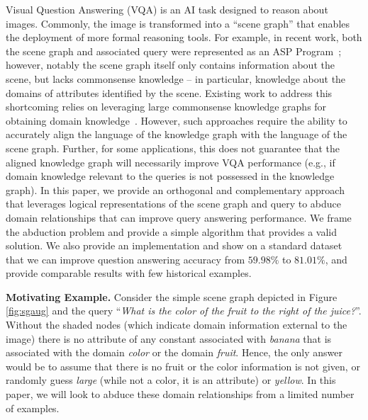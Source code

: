Visual Question Answering (VQA) is an AI task designed to reason about images.  Commonly, the image is transformed into a ``scene graph'' that enables the deployment of more formal reasoning tools.  For example, in recent work, both the scene graph and associated query were represented as an ASP Program~\cite{eiter2022neuro, kinjal2020aqua}; however,  notably the scene graph itself only contains information about the scene, but lacks commonsense knowledge -- in particular, knowledge about the domains of attributes identified by the scene. 
Existing work to address this shortcoming relies on leveraging large commonsense knowledge graphs for obtaining domain knowledge~\cite{marino2019ok, schwenk2022okvqa, wang2017fvqa}.  However, such approaches require the ability to accurately align the language of the knowledge graph with the language of the scene graph.  Further, for some applications, this does not guarantee that the aligned knowledge graph will necessarily improve VQA performance (e.g., if domain knowledge relevant to the queries is not possessed in the knowledge graph).  In this paper, we provide an orthogonal and complementary approach that leverages logical representations of the scene graph and query to abduce domain relationships that can improve query answering performance.  We frame the abduction problem and provide a simple algorithm that provides a valid solution. 
We also provide an implementation and show on a standard dataset that we can improve question answering accuracy from $59.98\%$ to $81.01\%$, and provide comparable results with few historical examples.

\medskip
\noindent\textbf{Motivating Example.} Consider the simple scene graph depicted in Figure \ref{fig:sgaug} and the query ``\textit{What is the color of the fruit to the right of the juice?}''.
Without the shaded nodes (which indicate domain information external to the image) there is no attribute of any constant associated with \textit{banana} that is associated with the domain \textit{color} or the domain \textit{fruit}.  Hence, the only answer would be to assume that there is no fruit or the color information is not given, or randomly guess \textit{large} 
(while not a color, it is an attribute) or \textit{yellow}.  
In this paper, we will look to abduce these domain relationships from a limited number of examples.






